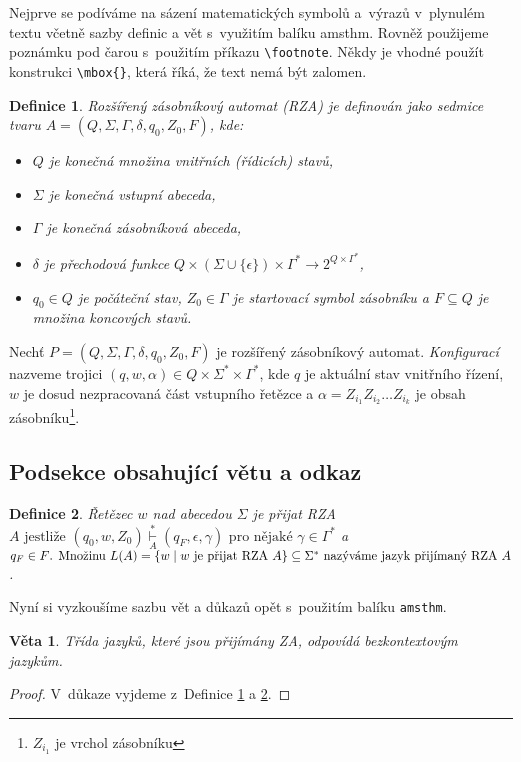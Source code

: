 \documentclass[11pt,a4paper,twocolumn]{article}
\newtheorem{definition}{Definice}
\newtheorem{theorem}{Věta}
\begin{document}
Nejprve se podíváme na sázení matematických symbolů a~výrazů v~plynulém textu včetně sazby definic a vět s~využitím balíku amsthm. Rovněž použijeme poznámku pod čarou s~použitím příkazu \verb|\footnote|. Někdy je vhodné použít konstrukci \verb|\mbox{}|, která říká, že text nemá být zalomen.
\begin{definition}\label{def1}
\textup{Rozšířený zásobníkový automat} (RZA) je definován jako sedmice tvaru $A=(Q,\Sigma,\Gamma,\delta, q_0,Z_0, F)$, kde:
\begin{itemize}
    \item[$\bullet$] $Q$ je konečná množina \textup{vnitřních (řídicích) stavů,}
    \item[$\bullet$] $\Sigma$ je konečná \textup{vstupní abeceda,}
    \item[$\bullet$] $\Gamma$ je konečná \textup{zásobníková abeceda,}
    \item[$\bullet$] $\delta$ je \textup{přechodová funkce} $Q \times (\Sigma \cup \{\epsilon\}) \times \Gamma^\ast \rightarrow 2^{Q \times \Gamma^\ast}$,
    \item[$\bullet$] $q_0 \in Q$ je \textup{počáteční stav, $Z_0 \in \Gamma$ je startovací symbol zásobníku a $F \subseteq Q$ je množina koncových stavů.}
\end{itemize}
\end{definition}

Nechť $P=(Q,\Sigma,\Gamma,\delta, q_0,Z_0, F)$ je rozšířený zásobníkový automat. \emph{Konfigurací} nazveme trojici $(q, w, \alpha) \in Q \times \Sigma^\ast \times \Gamma^\ast$, kde $q$ je aktuální stav vnitřního řízení, $w$ je dosud nezpracovaná část vstupního řetězce a $\alpha = Z_{i_1} Z_{i_2} \ldots Z_{i_k}$ je obsah zásobníku\footnote{$Z_{i_1}$ je vrchol zásobníku}.
\subsection{Podsekce obsahující větu a odkaz}
\begin{definition}\label{def2}
\textup{Řetězec $w$ nad abecedou $\Sigma$ je přijat RZA}
$A \text{ jestliže }(q_0,w,Z_0)\overset{\ast}{ \underset{A}{\vdash}} (q_F,\epsilon, \gamma) \text{ pro nějaké }\gamma \in \Gamma^\ast$ a $q_F \in F \text{. Množinu } L(A)=\{ w \mid w \textup{ je přijat RZA } A \} \subseteq \Sigma^* \text{ nazýváme}\textup{ jazyk přijímaný RZA } A$.
\end{definition}
Nyní si vyzkoušíme sazbu vět a důkazů opět s~použitím balíku \verb|amsthm|.
\begin{theorem}
Třída jazyků, které jsou přijímány ZA, odpovídá bezkontextovým jazykům.
\end{theorem}
\begin{proof}
V~důkaze vyjdeme z~Definice \ref{def1} a \ref{def2}.
\end{proof}
\end{document}
